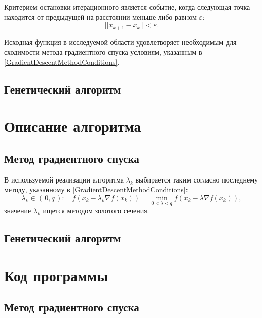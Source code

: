 \documentclass[10pt,a4paper,titlepage]{article}
\begin{document}

Критерием остановки итерационного является событие, когда следующая точка находится от предыдущей 
на расстоянии меньше либо равном $\varepsilon$:
$$ || x_{k+1} - x_k || < \varepsilon. $$

Исходная функция в исследуемой области %
удовлетворяет необходимым для сходимости метода градиентного спуска условиям, указанным в \ref{GradientDescentMethodConditions}.

\subsection{Генетический алгоритм}


\section{Описание алгоритма}
\subsection{Метод градиентного спуска}

В используемой реализации алгоритма $\lambda_k$ выбирается таким согласно последнему методу, указанному в \ref{GradientDescentMethodConditions}:
$$
  \lambda_k \in (\,0, q\,)\!: 
    \quad f(x_k - \lambda_k \nabla f(x_k)) = \min\limits_{0 < \lambda < q} f(x_k - \lambda \nabla f(x_k)),
$$
значение $\lambda_k$ ищется методом золотого сечения.


\subsection{Генетический алгоритм}

\section{Код программы}
\subsection{Метод градиентного спуска}
\lstset{language=C++, caption=Градиентный спуск,%
label=gd-source-code, basicstyle=\footnotesize,%
numbers=left, numberstyle=\footnotesize, numbersep=5pt, frame=single, breaklines=true, breakatwhitespace=false,%
inputencoding=utf8x}

\end{document}
